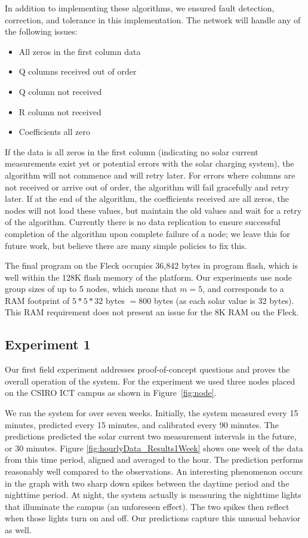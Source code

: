 \documentclass[prodmode,acmtosn]{acmsmall}
\begin{document}
In addition to implementing these algorithms, we ensured fault detection, correction, and tolerance in this implementation.
The network will handle any of the following issues:

\begin{itemize}
\item All zeros in the first column data
\item Q columns received out of order
\item Q column not received
\item R column not received
\item Coefficients all zero
\end{itemize}

If the data is all zeros in the first column (indicating no solar current measurements exist yet or potential errors with the solar charging system), the algorithm will not commence and will retry later.
For errors where columns are not received or arrive out of order, the algorithm will fail gracefully and retry later.
If at the end of the algorithm, the coefficients received are all zeros, the nodes will not load these values, but maintain the old values and wait for a retry of the algorithm.
Currently there is no data replication to ensure successful completion of the algorithm upon complete failure of a node; we leave this for future work, but believe there are many simple policies to fix this. 

The final program on the Fleck occupies 36,842 bytes in program flash, which is well within the 128K flash memory of the platform. Our experiments use node group sizes of up to 5 nodes, which  means that $m=5$, and corresponds to a RAM footprint of $5*5*32$ bytes $=800$ bytes (as each solar value is 32 bytes).  This RAM requirement does not present an issue for the 8K RAM on the Fleck.

\subsection{Experiment 1}
Our first field experiment addresses proof-of-concept questions and proves the overall operation of the system.
For the experiment we used three nodes placed on the CSIRO ICT campus as shown in Figure~\ref{fig:node}.

We ran the system for over seven weeks.
Initially, the system measured every 15 minutes, predicted every 15 minutes, and calibrated every 90 minutes.
The predictions predicted the solar current two measurement intervals in the future, or 30 minutes.
Figure \ref{fig:hourlyData_Results1Week} shows one week of the data from this time period, aligned and averaged to the hour.
The prediction performs reasonably well compared to the observations.
An interesting phenomenon occurs in the graph with two sharp down spikes between the daytime period and the nighttime period.
At night, the system actually is measuring the nighttime lights that illuminate the campus (an unforeseen effect).
The two spikes then reflect when those lights turn on and off.
Our predictions capture this unusual behavior as well.
\end{document}
